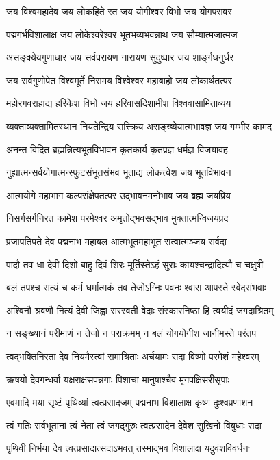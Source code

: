 \twolineshloka
{जय विश्वमहादेव जय लोकहिते रत}
{जय योगीश्वर विभो जय योगपरावर}


\twolineshloka
{पद्मगर्भविशालाक्ष जय लोकेश्वरेश्वर}
{भूतभव्यभवन्नाथ जय सौम्यात्मजात्मज}


\twolineshloka
{असङ्क्येयगुणाधार जय सर्वपरायण}
{नारायण सुदुष्पार जय शार्ङ्गधनुर्धर}


\twolineshloka
{जय सर्वगुणोपेत विश्वमूर्ते निरामय}
{विश्वेश्वर महाबाहो जय लोकार्थतत्पर}


\twolineshloka
{महोरगवराहाद्य हरिकेश विभो जय}
{हरिवासदिशामीश विश्ववासामिताव्यय}


\twolineshloka
{व्यक्ताव्यक्तामितस्थान नियतेन्द्रिय सत्त्क्रिय}
{असङ्ख्येयात्मभावज्ञ जय गम्भीर कामद}


\twolineshloka
{अनन्त विदित ब्रह्मन्नित्यभूतविभावन}
{कृतकार्य कृतप्रज्ञ धर्मज्ञ विजयावह}


\twolineshloka
{गुह्यात्मन्सर्वयोगात्मन्स्फुटसंभूतसंभव}
{भूताद्य लोकत्त्वेश जय भूतविभावन}


\twolineshloka
{आत्मयोगे महाभाग कल्पसंक्षेपतत्पर}
{उद्भावनमनोभाव जय ब्रह्म जयप्रिय}


\twolineshloka
{निसर्गसर्गनिरत कामेश परमेश्वर}
{अमृतोद्भवसद्भाव मुक्तात्मन्विजयप्रद}


\twolineshloka
{प्रजापतिपते देव पद्मनाभ महाबल}
{आत्मभूतमहाभूत सत्वात्मञ्जय सर्वदा}


\twolineshloka
{पादौ तव धा देवी दिशो बाहु दिवं शिरः}
{मूर्तिस्तेऽहं सुराः कायश्चन्द्रादित्यौ च चक्षुषी}


\twolineshloka
{बलं तपश्च सत्यं च कर्म धर्मात्मकं तव}
{तेजोऽग्निः पवनः श्वास आपस्ते स्वेदसंभवाः}


\twolineshloka
{अश्विनौ श्रवणौ नित्यं देवी जिह्वा सरस्वती}
{वेदाः संस्कारनिष्ठा हि त्वयीदं जगदाश्रितम्}


\twolineshloka
{न सङ्ख्यानं परीमाणं न तेजो न पराक्रमम्}
{न बलं योगयोगीश जानीमस्ते परंतप}


\twolineshloka
{त्वद्भक्तिनिरता देव नियमैस्त्वां समाश्रिताः}
{अर्चयामः सदा विष्णो परमेशं महेश्वरम्}


\twolineshloka
{ऋषयो देवगन्धर्वा यक्षराक्षसपन्नगाः}
{पिशाचा मानुषाश्चैव मृगपक्षिसरीसृपाः}


\twolineshloka
{एवमादि मया सृष्टं पृथिव्यां त्वत्प्रसादजम्}
{पद्मनाभ विशालाक्ष कृष्ण दुःश्वप्रणाशन}


\twolineshloka
{त्वं गतिः सर्वभूतानां त्वं नेता त्वं जगद्गुरुः}
{त्वत्प्रसादेन देवेश सुखिनो विबुधाः सदा}


\twolineshloka
{पृथिवी निर्भया देव त्वत्प्रसादात्सदाऽभवत्}
{तस्माद्भव विशालाक्ष यदुवंशविवर्धनः}



